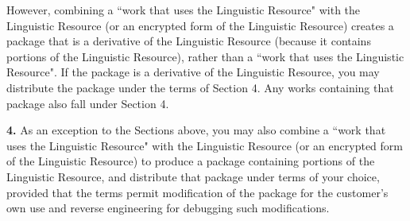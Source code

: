 \documentclass[10pt]{article}
\begin{document}
\vspace{5pt}\noindent
However, 
      combining a ``work that uses the Linguistic Resource" with the Linguistic 
      Resource (or an encrypted form of the Linguistic Resource) creates a 
      package that is a derivative of the Linguistic Resource (because it
      contains portions of the Linguistic Resource), rather than a ``work that 
      uses the Linguistic Resource". If the package is a derivative of the 
      Linguistic Resource, you may distribute the package under the terms of 
      Section 4. Any works containing that package also fall under Section 4. 

\vspace{5pt}\noindent
{\bf 4.}
As an exception to the 
      Sections above, you may also combine a ``work that uses the Linguistic 
      Resource" with the Linguistic Resource (or an encrypted form of the 
      Linguistic Resource) to produce a package containing portions of the 
      Linguistic Resource, and distribute that package under terms of your 
      choice, provided that the terms permit modification of the package for the 
      customer's own use and reverse engineering for debugging such 
      modifications. 
\end{document}
